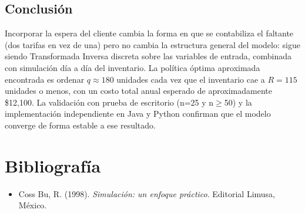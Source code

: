 \documentclass[12pt, a4paper]{article}
\begin{document}
\subsection{Conclusión}

Incorporar la espera del cliente cambia la forma en que se contabiliza el faltante (dos tarifas en vez de una) pero no cambia la estructura general del modelo: sigue siendo Transformada Inversa discreta sobre las variables de entrada, combinada con simulación día a día del inventario. La política óptima aproximada encontrada es ordenar $q \approx 180$ unidades cada vez que el inventario cae a $R=115$ unidades o menos, con un costo total anual esperado de aproximadamente \$12,100. La validación con prueba de escritorio (n=25 y n$\geq$50) y la implementación independiente en Java y Python confirman que el modelo converge de forma estable a ese resultado.


\newpage

\section*{Bibliografía}

\begin{itemize}
  \item Coss Bu, R. (1998). \textit{Simulación: un enfoque práctico}. Editorial Limusa, México.
\end{itemize}
\end{document}

